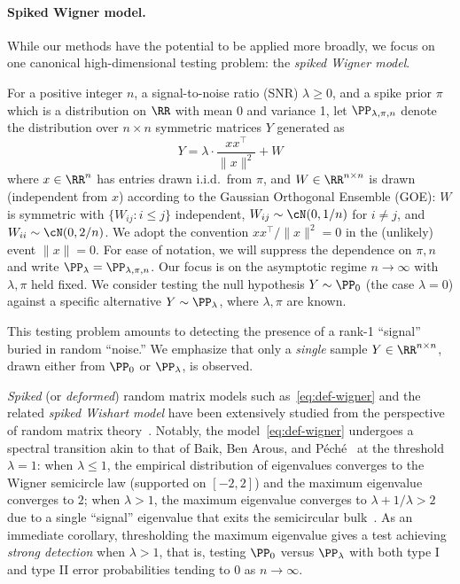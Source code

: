\documentclass[11pt]{article}
\begin{document}
\paragraph{Spiked Wigner model.} While our methods have the potential to be applied more broadly, we focus on one canonical high-dimensional testing problem: the \emph{spiked Wigner model}.

\begin{definition}
\label{def:wigner}
For a positive integer $n$, a signal-to-noise ratio (SNR) $\lambda \ge 0$, and a spike prior $\pi$ which is a distribution on $\RR$ with mean 0 and variance 1, let $\PP_{\lambda,\pi,n}$ denote the distribution over $n \times n$ symmetric matrices $Y$ generated as
\begin{equation}\label{eq:def-wigner}
Y = \lambda \cdot \frac{xx^\top}{\|x\|^2} + W
\end{equation}
where $x \in \RR^n$ has entries drawn i.i.d.\ from $\pi$, and $W \in \RR^{n \times n}$ is drawn (independent from $x$) according to the Gaussian Orthogonal Ensemble (GOE): $W$ is symmetric with $\{W_{ij} : i \le j\}$ independent, $W_{ij} \sim \cN(0,1/n)$ for $i \ne j$, and $W_{ii} \sim \cN(0,2/n)$. We adopt the convention $xx^\top/\|x\|^2 = 0$ in the (unlikely) event $\|x\| = 0$. For ease of notation, we will suppress the dependence on $\pi,n$ and write $\PP_\lambda = \PP_{\lambda,\pi,n}$. Our focus is on the asymptotic regime $n \to \infty$ with $\lambda,\pi$ held fixed. We consider testing the null hypothesis $Y \sim \PP_0$ (the case $\lambda = 0$) against a specific alternative $Y \sim \PP_\lambda$, where $\lambda,\pi$ are known.
\end{definition}

\noindent This testing problem amounts to detecting the presence of a rank-1 ``signal'' buried in random ``noise.'' We emphasize that only a \emph{single} sample $Y \in \RR^{n \times n}$, drawn either from $\PP_0$ or $\PP_\lambda$, is observed.

\emph{Spiked} (or \emph{deformed}) random matrix models such as~\eqref{eq:def-wigner} and the related \emph{spiked Wishart model} have been extensively studied from the perspective of random matrix theory~\cite{johnstone,BBP,BS-spiked,peche,paul,FP-wigner,maida,BY-limit,CDF-wigner,nadler,BN-eigenvec,PRS-wigner}. Notably, the model~\eqref{eq:def-wigner} undergoes a spectral transition akin to that of Baik, Ben Arous, and P\'ech\'e~\cite{BBP} at the threshold $\lambda = 1$: when $\lambda \le 1$, the empirical distribution of eigenvalues converges to the Wigner semicircle law (supported on $[-2,2]$) and the maximum eigenvalue converges to $2$; when $\lambda > 1$, the maximum eigenvalue converges to $\lambda + 1/\lambda > 2$ due to a single ``signal'' eigenvalue that exits the semicircular bulk~\cite{FP-wigner,maida}. As an immediate corollary, thresholding the maximum eigenvalue gives a test achieving \emph{strong detection} when $\lambda > 1$, that is, testing $\PP_0$ versus $\PP_\lambda$ with both type I and type II error probabilities tending to $0$ as $n \to \infty$.
\end{document}
